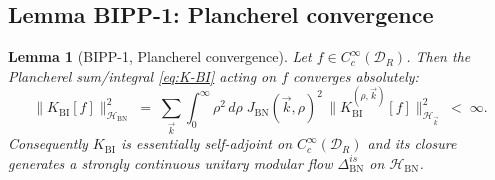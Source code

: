 \documentclass[11pt,a4paper]{article}
\newtheorem{lemma}[theorem]{Lemma}
\theoremstyle{definition}
\newcommand{\cH}{\mathcal{H}}
\newcommand{\cD}{\mathcal{D}}
\newcommand{\BI}{\mathrm{BI}}
\newcommand{\BN}{\mathrm{BN}}
\begin{document}
\subsection{Lemma BIPP-1: Plancherel convergence}

\begin{lemma}[BIPP-1, Plancherel convergence]\label{lem:BIPP-1}
Let $f\in C_c^\infty(\cD_R)$. Then the Plancherel sum/integral
\eqref{eq:K-BI} acting on $f$ converges absolutely:
\begin{equation}\label{eq:abs-conv}
\|K_\BI[f]\|_{\cH_\BN}^2
\;=\; \sum_{\vec k}\int_0^\infty \rho^2\,d\rho\;
J_\BN(\vec k,\rho)^2\,\big\|K_\BI^{(\rho,\vec k)}[f]\big\|^2_{\cH_{\vec k}}
\;<\;\infty.
\end{equation}
Consequently $K_\BI$ is essentially self-adjoint on $C_c^\infty(\cD_R)$ and
its closure generates a strongly continuous unitary modular flow
$\Delta_\BN^{is}$ on $\cH_\BN$.
\end{lemma}
\end{document}
